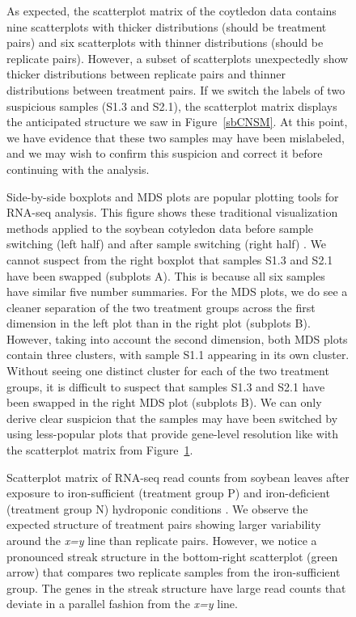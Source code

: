 \documentclass{bmcart}
\begin{document}
\begin{linenumbers}
\begin{backmatter}
\begin{figure}[h!]
\caption{
As expected, the scatterplot matrix of the coytledon data \cite{Brown} contains nine scatterplots with thicker distributions (should be treatment pairs) and six scatterplots with thinner distributions (should be replicate pairs). However, a subset of scatterplots unexpectedly show thicker distributions between replicate pairs and thinner distributions between treatment pairs. If we switch the labels of two suspicious samples (S1.3 and S2.1), the scatterplot matrix displays the anticipated structure we saw in Figure~\ref{sbCNSM}. At this point, we have evidence that these two samples may have been mislabeled, and we may wish to confirm this suspicion and correct it before continuing with the analysis.
\label{sbCNSwitchedSM}}
\end{figure}

\begin{figure}[h!]
\caption{
Side-by-side boxplots and MDS plots are popular plotting tools for RNA-seq analysis. This figure shows these traditional visualization methods applied to the soybean cotyledon data before sample switching (left half) and after sample switching (right half) \cite{Brown}. We cannot suspect from the right boxplot that samples S1.3 and S2.1 have been swapped (subplots A). This is because all six samples have similar five number summaries. For the MDS plots, we do see a cleaner separation of the two treatment groups across the first dimension in the left plot than in the right plot (subplots B). However, taking into account the second dimension, both MDS plots contain three clusters, with sample S1.1 appearing in its own cluster. Without seeing one distinct cluster for each of the two treatment groups, it is difficult to suspect that samples S1.3 and S2.1 have been swapped in the right MDS plot (subplots B). We can only derive clear suspicion that the samples may have been switched by using less-popular plots that provide gene-level resolution like with the scatterplot matrix from Figure~\ref{sbCNSwitchedSM}.
\label{mdsSwitch}}
\end{figure}

\begin{figure}[h!]
\caption{
Scatterplot matrix of RNA-seq read counts from soybean leaves after exposure to iron-sufficient (treatment group P) and iron-deficient (treatment group N) hydroponic conditions \cite{Lauter16}. We observe the expected structure of treatment pairs showing larger variability around the \textit{x=y} line than replicate pairs. However, we notice a pronounced streak structure in the bottom-right scatterplot (green arrow) that compares two replicate samples from the iron-sufficient group. The genes in the streak structure have large read counts that deviate in a parallel fashion from the \textit{x=y} line.
\label{structure}}
\end{figure}


\end{backmatter}
\end{linenumbers}
\end{document}
